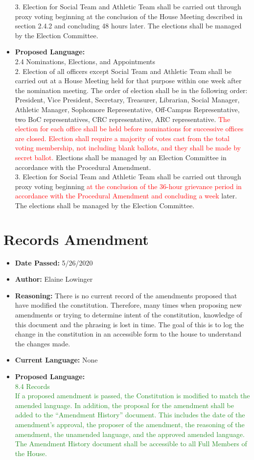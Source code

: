 \documentclass[10pt]{article} %
\begin{document}
\begin{itemize}
	3. Election for Social Team and Athletic Team shall be carried out through proxy voting beginning at the conclusion of the House Meeting described in section 2.4.2 and concluding 48 hours later. The elections shall be managed by the Election Committee. 
	\item \textbf{Proposed Language:} \\
	2.4 Nominations, Elections, and Appointments \\
	2. Election of all officers except Social Team and Athletic Team shall be carried out at a House Meeting held for that purpose within one week after the nomination meeting. The order of election shall be in the following order: President, Vice President, Secretary, Treasurer, Librarian, Social Manager, Athletic Manager, Sophomore Representative, Off-Campus Representative, two BoC representatives, CRC representative, ARC representative. \textcolor{red}{The election for each office shall be held before nominations for successive offices are closed. Election shall require a majority of votes cast from the total voting membership, not including blank ballots, and they shall be made by secret ballot.} Elections shall be managed by an Election Committee in accordance with the Procedural Amendment. \\
	3. Election for Social Team and Athletic Team shall be carried out through proxy voting beginning \textcolor{red}{at the conclusion of the 36-hour grievance period in accordance with the Procedural Amendment and concluding a week} later. The elections shall be managed by the Election Committee. 
\end{itemize}

\section{Records Amendment}
\begin{itemize}
	\item \textbf{Date Passed:} 5/26/2020
	\item \textbf{Author:} Elaine Lowinger
	\item \textbf{Reasoning:} There is no current record of the amendments proposed that have modified the constitution. Therefore, many times when proposing new amendments or trying to determine intent of the constitution, knowledge of this document and the phrasing is lost in time. The goal of this is to log the change in the constitution in an accessible form to the house to understand the changes made. 
	\item \textbf{Current Language:} None
	\item \textbf{Proposed Language:} \\
	\textcolor{ForestGreen}{
	8.4 Records \\
	If a proposed amendment is passed, the Constitution is modified to match the amended language. In addition, the proposal for the amendment shall be added to the “Amendment History” document. This includes the date of the amendment’s approval, the proposer of the amendment, the reasoning of the amendment, the unamended language, and the approved amended language. The Amendment History document shall be accessible to all Full Members of the House.}
\end{itemize}
\end{document}
